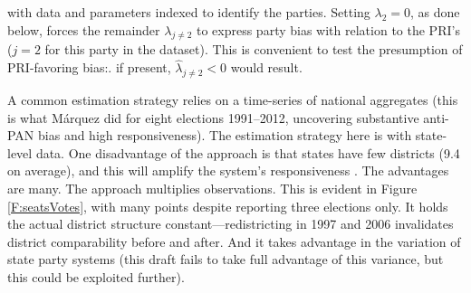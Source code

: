 \documentclass[letter,12pt]{article}
\begin{document}
\noindent with data and parameters indexed to identify the parties. \citep[Another, with application to Argentine federalism, is][.]{calvo.micozzi.govReform.2005} Setting $\lambda_2 = 0$, as done below, forces the remainder $\lambda_{j \neq 2}$ to express party bias with relation to the PRI's ($j=2$ for this party in the dataset). This is convenient to test the presumption of PRI-favoring bias:. if present, $\hat{\lambda}_{j \neq 2}<0$ would result.

A common estimation strategy relies on a time-series of national aggregates (this is what M\'arquez did for eight elections 1991--2012, uncovering substantive anti-PAN bias and high responsiveness). The estimation strategy here is with state-level data. One disadvantage of the approach is that states have few districts (9.4 on average), and this will amplify the system's responsiveness \citep{taagepera.CubeLaw.1973}. The advantages are many. The approach multiplies observations. This is evident in Figure \ref{F:seatsVotes}, with many points despite reporting three elections only. It holds the actual district structure constant---redistricting in 1997 and 2006 invalidates district comparability before and after. And it takes advantage in the variation of state party systems (this draft fails to take full advantage of this variance, but this could be exploited further). 
\end{document}
